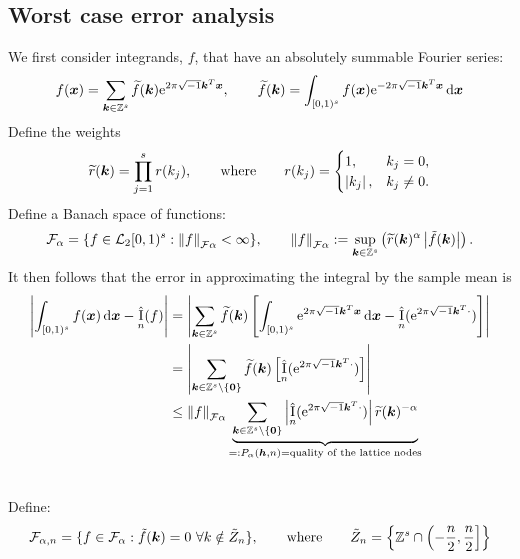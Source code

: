 \documentclass{amsart}
\newcommand{\tr}{\widetilde{r}}
\newcommand{\appxintn}{\appxint_n}
\DeclareMathOperator{\appxint}{\hat{I}}
\begin{document}
\subsection{Worst case error analysis}
We first consider integrands, $f$, that have an absolutely summable Fourier series:
\begin{equation} \label{eq:fseries}
    f(\boldsymbol{x}) = \sum_{\boldsymbol{k} \in \mathbb{Z}^s} \widetilde{f}(\boldsymbol{k}) \mathrm{e}^{2 \pi \sqrt{-1} \boldsymbol{k}^T \boldsymbol{x}}, \qquad \widetilde{f}(\boldsymbol{k}) = \int_{[0,1)^s} f(\boldsymbol{x}) \mathrm{e}^{-2 \pi \sqrt{-1} \boldsymbol{k}^T \boldsymbol{x}}\, {\rm d} \boldsymbol{x}
\end{equation}
Define the weights
\begin{equation}
\tr(\vk) = \prod_{j=1}^{s} r(k_{j}),
\qquad \text{where} \qquad r(k_{j})=\begin{cases} 1, &
k_{j}=0, \\ \abs{k_{j}}, & k_{j} \ne 0.  \end{cases}
\end{equation}
Define a Banach
space of functions:
$$
\cf_{\alpha} = \{ f \in \cl_2[0,1)^s :
\norm[\cf{\alpha}]{f} < \infty \}, \qquad
\norm[\cf{\alpha}]{f} := \sup_{\vk \in \integers^{s}}
\left(\tr(\vk)^{\alpha} \abs{\tilde{f}(\vk)} \right).
$$
It then follows that the error in approximating the integral by the sample mean is
\begin{align} \label{eq:wcerrPalpha}
\abs{\int_{[0,1)^s} f(\vx) \, \dif \vx - \appxint_n(f)} &
= \abs{\sum_{\vk \in \integers^s} \tf(\vk) \left[\int_{[0,1)^s} \me^{2 \pi \sqrt{-1} \vk^T \vx} \, \dif \vx - \appxintn(\me^{2 \pi \sqrt{-1} \vk^T \cdot})\right]} \\
\nonumber
& = \abs{\sum_{\vk \in \integers^s \setminus\{\vzero\}} \tf(\vk) \left[ \appxintn(\me^{2 \pi \sqrt{-1} \vk^T \cdot})\right]} \\
\nonumber
& \le \norm[\cf{\alpha}]{f} \underbrace{\sum_{\vk \in \integers^s \setminus\{\vzero\}} \abs{\appxint_n(\me^{2 \pi \sqrt{-1} \vk^T \cdot})}\tr(\vk)^{-\alpha}}_{=: P_\alpha(\vh,n) = \text{quality of the lattice nodes}} \\
\nonumber
\end{align}

Define:
$$
\mathcal{F}_{\alpha,n} = \{ f \in \mathcal{F}_{\alpha} :
\tilde{f}(\boldsymbol{k}) = 0 \ \forall k \notin \tilde Z_n \} , \qquad \text{where} \qquad \tilde Z_n = \left\{\mathbb{Z}^s \cap \left(-\frac{n}{2},\frac{n}{2}\right]\right\}
$$
\end{document}
